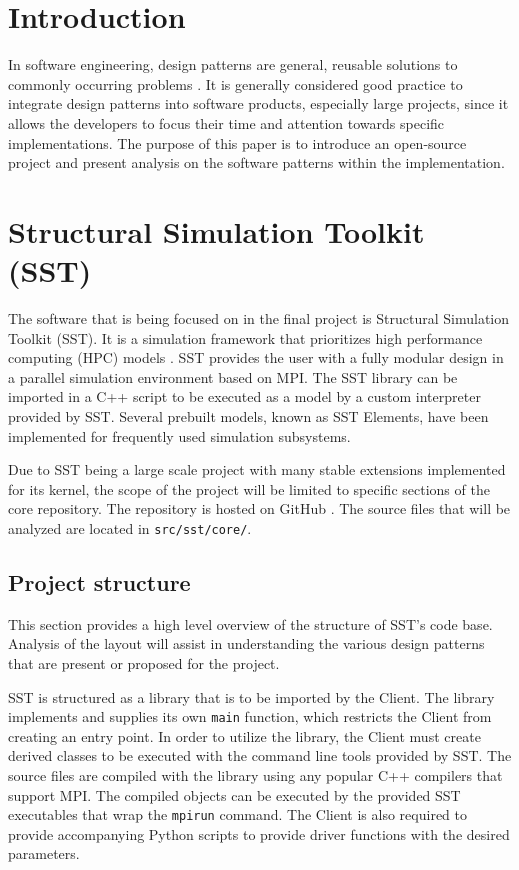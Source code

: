 \section{Introduction}
In software engineering, design patterns are general, reusable solutions to commonly occurring problems \cite{source-making}. It is generally considered good practice to integrate design patterns into software products, especially large projects, since it allows the developers to focus their time and attention towards specific implementations. The purpose of this paper is to introduce an open-source project and present analysis on the software patterns within the implementation.

\section{Structural Simulation Toolkit (SST)}
The software that is being focused on in the final project is Structural Simulation Toolkit (SST). It is a simulation framework that prioritizes high performance computing (HPC) models \cite{sst}. SST provides the user with a fully modular design in a parallel simulation environment based on MPI. The SST library can be imported in a C++ script to be executed as a model by a custom interpreter provided by SST. Several prebuilt models, known as SST Elements, have been implemented for frequently used simulation subsystems.

Due to SST being a large scale project with many stable extensions implemented for its kernel, the scope of the project will be limited to specific sections of the core repository. The repository is hosted on GitHub \cite{sst-repo}. The source files that will be analyzed are located in \texttt{src/sst/core/}.

\subsection{Project structure}
This section provides a high level overview of the structure of SST's code base. Analysis of the layout will assist in understanding the various design patterns that are present or proposed for the project.

SST is structured as a library that is to be imported by the Client. The library implements and supplies its own \texttt{main} function, which restricts the Client from creating an entry point. In order to utilize the library, the Client must create derived classes to be executed with the command line tools provided by SST. The source files are compiled with the library using any popular C++ compilers that support MPI. The compiled objects can be executed by the provided SST executables that wrap the \texttt{mpirun} command. The Client is also required to provide accompanying Python scripts to provide driver functions with the desired parameters.

